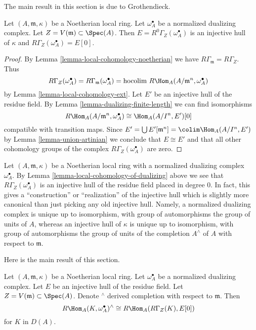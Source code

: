 \noindent
The main result in this section is due to Grothendieck.

\begin{lemma}
\label{lemma-local-cohomology-of-dualizing}
Let $(A, \mathfrak m, \kappa)$ be a Noetherian local ring.
Let $\omega_A^\bullet$ be a normalized dualizing complex.
Let $Z = V(\mathfrak m) \subset \Spec(A)$.
Then $E = R^0\Gamma_Z(\omega_A^\bullet)$ is an injective hull of
$\kappa$ and $R\Gamma_Z(\omega_A^\bullet) = E[0]$.
\end{lemma}

\begin{proof}
By Lemma \ref{lemma-local-cohomology-noetherian} we have
$R\Gamma_{\mathfrak m} = R\Gamma_Z$. Thus
$$
R\Gamma_Z(\omega_A^\bullet) =
R\Gamma_{\mathfrak m}(\omega_A^\bullet) =
\text{hocolim}\ R\Hom_A(A/\mathfrak m^n, \omega_A^\bullet)
$$
by Lemma \ref{lemma-local-cohomology-ext}. Let $E'$ be an injective
hull of the residue field.
By Lemma \ref{lemma-dualizing-finite-length}
we can find isomorphisms
$$
R\Hom_A(A/\mathfrak m^n, \omega_A^\bullet) \cong \Hom_A(A/I^n, E')[0]
$$
compatible with transition maps. Since
$E' = \bigcup E'[\mathfrak m^n] = \colim \Hom_A(A/I^n, E')$
by Lemma \ref{lemma-union-artinian}
we conclude that $E \cong E'$ and that all other cohomology
groups of the complex $R\Gamma_Z(\omega_A^\bullet)$ are zero.
\end{proof}

\begin{remark}
\label{remark-specific-injective-hull}
Let $(A, \mathfrak m, \kappa)$ be a Noetherian local ring
with a normalized dualizing complex $\omega_A^\bullet$.
By Lemma \ref{lemma-local-cohomology-of-dualizing}
above we see that $R\Gamma_Z(\omega_A^\bullet)$
is an injective hull of the residue field placed in degree $0$.
In fact, this gives a ``construction'' or ``realization''
of the injective hull which is slightly more canonical than
just picking any old injective hull. Namely, a normalized
dualizing complex is unique up to isomorphism, with group
of automorphisms the group of units of $A$, whereas an
injective hull of $\kappa$ is unique up to isomorphism, with
group of automorphisms the group of units of the completion
$A^\wedge$ of $A$ with respect to $\mathfrak m$.
\end{remark}

\noindent
Here is the main result of this section.

\begin{theorem}
\label{theorem-local-duality}
Let $(A, \mathfrak m, \kappa)$ be a Noetherian local ring.
Let $\omega_A^\bullet$ be a normalized dualizing complex.
Let $E$ be an injective hull of the residue field.
Let $Z = V(\mathfrak m) \subset \Spec(A)$.
Denote ${}^\wedge$ derived completion with respect to $\mathfrak m$.
Then
$$
R\Hom_A(K, \omega_A^\bullet)^\wedge \cong R\Hom_A(R\Gamma_Z(K), E[0])
$$
for $K$ in $D(A)$.
\end{theorem}

